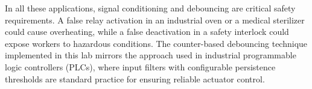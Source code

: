 In all these applications, signal conditioning and debouncing are critical safety requirements. A false relay activation in an industrial oven or a medical sterilizer could cause overheating, while a false deactivation in a safety interlock could expose workers to hazardous conditions. The counter-based debouncing technique implemented in this lab mirrors the approach used in industrial programmable logic controllers (PLCs), where input filters with configurable persistence thresholds are standard practice for ensuring reliable actuator control.
